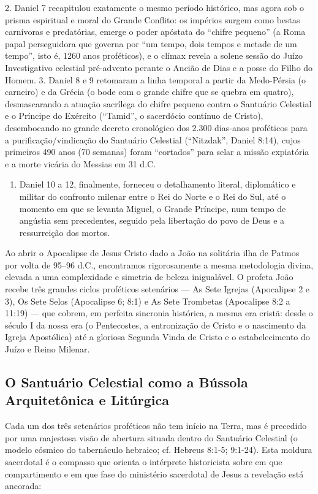 2. Daniel 7 recapitulou exatamente o mesmo período histórico, mas agora sob o prisma espiritual e moral do Grande Conflito: os impérios surgem como bestas carnívoras e predatórias, emerge o poder apóstata do ``chifre pequeno'' (a Roma papal perseguidora que governa por ``um tempo, dois tempos e metade de um tempo'', isto é, 1260 anos proféticos), e o clímax revela a solene sessão do Juízo Investigativo celestial pré-advento perante o Ancião de Dias e a posse do Filho do Homem.
3. Daniel 8 e 9 retomaram a linha temporal a partir da Medo-Pérsia (o carneiro) e da Grécia (o bode com o grande chifre que se quebra em quatro), desmascarando a atuação sacrílega do chifre pequeno contra o Santuário Celestial e o Príncipe do Exército (``Tamid'', o sacerdócio contínuo de Cristo), desembocando no grande decreto cronológico dos 2.300 dias-anos proféticos para a purificação/vindicação do Santuário Celestial (``Nitzdak'', Daniel 8:14), cujos primeiros 490 anos (70 semanas) foram ``cortados'' para selar a missão expiatória e a morte vicária do Messias em 31 d.C.
\begin{enumerate}
  \item Daniel 10 a 12, finalmente, forneceu o detalhamento literal, diplomático e militar do confronto milenar entre o Rei do Norte e o Rei do Sul, até o momento em que se levanta Miguel, o Grande Príncipe, num tempo de angústia sem precedentes, seguido pela libertação do povo de Deus e a ressurreição dos mortos.
\end{enumerate}


Ao abrir o Apocalipse de Jesus Cristo dado a João na solitária ilha de Patmos por volta de 95–96 d.C., encontramos rigorosamente a mesma metodologia divina, elevada a uma complexidade e simetria de beleza inigualável. O profeta João recebe três grandes ciclos proféticos setenários — As Sete Igrejas (Apocalipse 2 e 3), Os Sete Selos (Apocalipse 6; 8:1) e As Sete Trombetas (Apocalipse 8:2 a 11:19) — que cobrem, em perfeita sincronia histórica, a mesma era cristã: desde o século I da nossa era (o Pentecostes, a entronização de Cristo e o nascimento da Igreja Apostólica) até a gloriosa Segunda Vinda de Cristo e o estabelecimento do Juízo e Reino Milenar.



\subsection{O Santuário Celestial como a Bússola Arquitetônica e Litúrgica}


Cada um dos três setenários proféticos não tem início na Terra, mas é precedido por uma majestosa visão de abertura situada dentro do Santuário Celestial (o modelo cósmico do tabernáculo hebraico; cf. Hebreus 8:1-5; 9:1-24). Esta moldura sacerdotal é o compasso que orienta o intérprete historicista sobre em que compartimento e em que fase do ministério sacerdotal de Jesus a revelação está ancorada:


